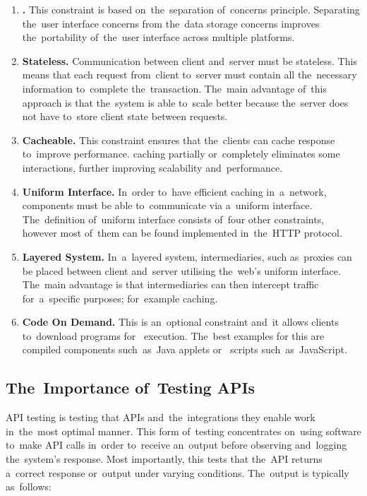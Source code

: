 \begin{enumerate}
  \item \textbf{.} This constraint is based
  on~the~separation of~concerns principle. Separating the~user interface
  concerns from the~data storage concerns improves the~portability of~the~user
  interface across multiple platforms.
  \item \textbf{Stateless.} Communication between client and~server must be
  stateless. This means that each request from~client to~server must contain all
  the~necessary information to~complete the~transaction. The~main advantage
  of~this approach is that the~system is able to~scale better because the~server
  does not have to~store client state between requests.
  \item \textbf{Cacheable.} This constraint ensures that the~clients can cache
  response to~improve performance.  caching partially
  or~completely eliminates some  interactions, further
  improving scalability and~performance.
  \item \textbf{Uniform Interface.} In~order to~have efficient caching
  in~a~network, components must be able to~communicate via a~uniform interface.
  The~definition of~uniform interface consists of~four other constraints,
  however most of~them can be found implemented in~the~HTTP protocol.
  \item \textbf{Layered System.} In~a~layered system, intermediaries, such
  as~proxies can be placed between client and~server utilising the~web's uniform
  interface. The~main advantage is that intermediaries can then intercept
   traffic for~a~specific purposes; for~example caching.
  \item \textbf{Code On Demand.} This is an~optional constraint and~it allows
  clients to~download programs for~ execution. The~best examples
  for this are compiled components such~as~Java applets or~
  scripts such~as~JavaScript.
\end{enumerate}

\subsection{The~Importance of~Testing APIs}
API testing is testing that APIs and~the~integrations they enable work
in~the~most optimal manner. This form of~testing concentrates on~using software
to~make API calls in~order to~receive an~output before observing and~logging
the~system's response. Most importantly, this tests that the~API returns
a~correct response or~output under varying conditions. The~output is typically
as~follows:


